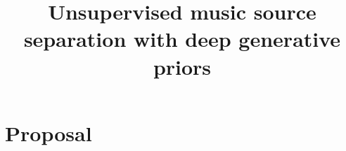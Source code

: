 \documentclass[a4paper,10pt,oneside,openany]{book}
\title{Unsupervised music source separation with deep generative priors}
\begin{document}
\frontmatter%
\maketitle

\tableofcontents
\clearpage

\mainmatter%
\chapter{Proposal}






\backmatter%

\printbibliography%
\end{document}
